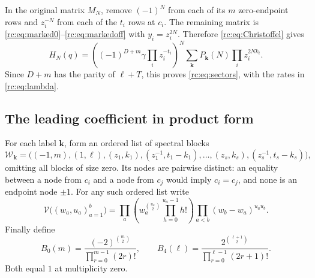 \documentclass[11pt,a4paper]{article}
\numberwithin{equation}{section}
\theoremstyle{definition}
\theoremstyle{remark}
\newcommand{\bk}{\boldsymbol{k}}
\newcommand{\V}{\mathcal V}
\begin{document}
In the original matrix $M_N$, remove $(-1)^N$ from each of its $m$
zero-endpoint rows and $z_i^{-N}$ from each of the $t_i$ rows at $c_i$.
The remaining matrix is \eqref{rc:eq:marked0}--\eqref{rc:eq:markedoff} with
$y_i=z_i^{2N}$.  Therefore \eqref{rc:eq:Christoffel} gives
\[
 H_N(q)=\left((-1)^{D+m}\gamma\prod_i z_i^{-t_i}\right)^N
                \sum_{\bk}P_{\bk}(N)\prod_i z_i^{2Nk_i}.
\]
Since $D+m$ has the parity of $\ell+T$, this proves
\eqref{rc:eq:sectors}, with the rates in \eqref{rc:eq:lambda}.

\subsection{The leading coefficient in product form}
For each label $\bk$, form an ordered list of spectral blocks
\begin{equation}\label{rc:eq:Wlist}
 \mathcal W_{\bk}=
 \bigl((-1,m),(1,\ell),
       (z_1,k_1),(z_1^{-1},t_1-k_1),\ldots,
       (z_s,k_s),(z_s^{-1},t_s-k_s)\bigr),
\end{equation}
omitting all blocks of size zero.  Its nodes are pairwise distinct:
an equality between a node from $c_i$ and a node from $c_j$ would imply
$c_i=c_j$, and none is an endpoint node $\pm1$.
For any such ordered list write
\begin{equation}\label{rc:eq:Vfunction}
 \V\bigl((w_a,u_a)_{a=1}^{b}\bigr)=
 \prod_a\left(w_a^{\binom{u_a}2}\prod_{h=0}^{u_a-1}h!\right)
 \prod_{a<b}(w_b-w_a)^{u_a u_b}.
\end{equation}
Finally define
\begin{equation}\label{rc:eq:B04}
 B_0(m)=\frac{(-2)^{\binom m2}}{\prod_{r=0}^{m-1}(2r)!},
 \qquad
 B_4(\ell)=\frac{2^{\binom{\ell+1}2}}
                         {\prod_{r=0}^{\ell-1}(2r+1)!}.
\end{equation}
Both equal $1$ at multiplicity zero.
\end{document}
